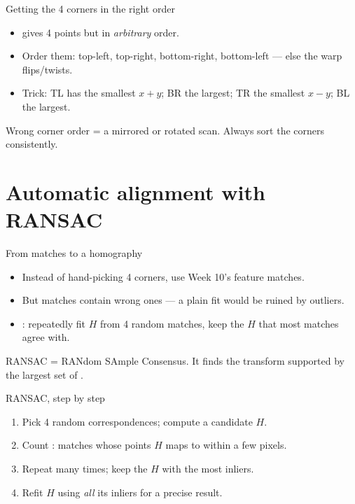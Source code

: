 \documentclass[10pt,aspectratio=169]{beamer}
\begin{document}
\begin{frame}{Getting the 4 corners in the right order}
  \begin{itemize}
    \item {} gives 4 points but in \emph{arbitrary} order.
    \item Order them: top-left, top-right, bottom-right, bottom-left — else the warp flips/twists.
    \item Trick: TL has the smallest $x{+}y$; BR the largest; TR the smallest $x{-}y$; BL the largest.
  \end{itemize}
  \begin{badbox}
    Wrong corner order = a mirrored or rotated scan. Always sort the corners consistently.
  \end{badbox}
\end{frame}

\section{Automatic alignment with RANSAC}

\begin{frame}{From matches to a homography}
  \begin{itemize}
    \item Instead of hand-picking 4 corners, use Week 10's feature matches.
    \item But matches contain wrong ones — a plain fit would be ruined by outliers.
    \item {}: repeatedly fit $H$ from 4 random matches, keep the $H$ that most matches agree with.
  \end{itemize}
  \begin{mathbox}
    RANSAC = RANdom SAmple Consensus. It finds the transform supported by the largest set of .
  \end{mathbox}
\end{frame}

\begin{frame}{RANSAC, step by step}
  \begin{enumerate}
    \item Pick 4 random correspondences; compute a candidate $H$.
    \item Count : matches whose points $H$ maps to within a few pixels.
    \item Repeat many times; keep the $H$ with the most inliers.
    \item Refit $H$ using \emph{all} its inliers for a precise result.
  \end{enumerate}
\end{frame}
\end{document}
